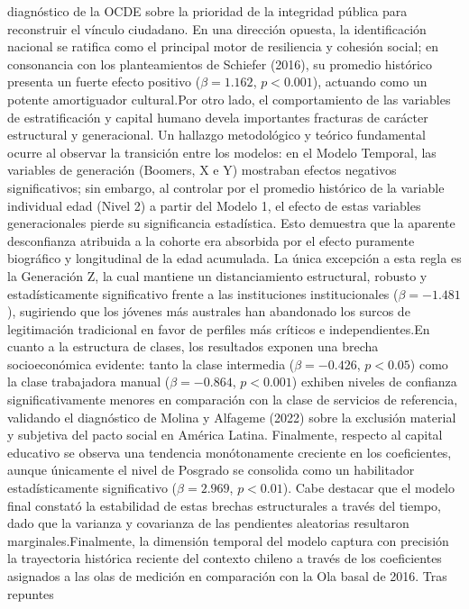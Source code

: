 \documentclass[
  spanish,
  a4paper,
  oneside]{scrbook}
\begin{document}
diagnóstico de la OCDE sobre la prioridad de la integridad pública para
reconstruir el vínculo ciudadano. En una dirección opuesta, la
identificación nacional se ratifica como el principal motor de
resiliencia y cohesión social; en consonancia con los planteamientos de
Schiefer (2016), su promedio histórico presenta un fuerte efecto
positivo (\(\beta = 1.162\), \(p < 0.001\)), actuando como un potente
amortiguador cultural.Por otro lado, el comportamiento de las variables
de estratificación y capital humano devela importantes fracturas de
carácter estructural y generacional. Un hallazgo metodológico y teórico
fundamental ocurre al observar la transición entre los modelos: en el
Modelo Temporal, las variables de generación (Boomers, X e Y) mostraban
efectos negativos significativos; sin embargo, al controlar por el
promedio histórico de la variable individual edad (Nivel 2) a partir del
Modelo 1, el efecto de estas variables generacionales pierde su
significancia estadística. Esto demuestra que la aparente desconfianza
atribuida a la cohorte era absorbida por el efecto puramente biográfico
y longitudinal de la edad acumulada. La única excepción a esta regla es
la Generación Z, la cual mantiene un distanciamiento estructural,
robusto y estadísticamente significativo frente a las instituciones
institucionales (\(\beta = -1.481\)), sugiriendo que los jóvenes más
australes han abandonado los surcos de legitimación tradicional en favor
de perfiles más críticos e independientes.En cuanto a la estructura de
clases, los resultados exponen una brecha socioeconómica evidente: tanto
la clase intermedia (\(\beta = -0.426\), \(p < 0.05\)) como la clase
trabajadora manual (\(\beta = -0.864\), \(p < 0.001\)) exhiben niveles
de confianza significativamente menores en comparación con la clase de
servicios de referencia, validando el diagnóstico de Molina y Alfageme
(2022) sobre la exclusión material y subjetiva del pacto social en
América Latina. Finalmente, respecto al capital educativo se observa una
tendencia monótonamente creciente en los coeficientes, aunque únicamente
el nivel de Posgrado se consolida como un habilitador estadísticamente
significativo (\(\beta = 2.969\), \(p < 0.01\)). Cabe destacar que el
modelo final constató la estabilidad de estas brechas estructurales a
través del tiempo, dado que la varianza y covarianza de las pendientes
aleatorias resultaron marginales.Finalmente, la dimensión temporal del
modelo captura con precisión la trayectoria histórica reciente del
contexto chileno a través de los coeficientes asignados a las olas de
medición en comparación con la Ola basal de 2016. Tras repuntes
\end{document}
